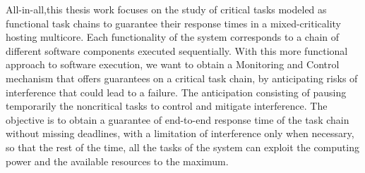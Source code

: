 \documentclass[french, a4paper, 11pt, twoside, pdftex]{StyleThese}
\begin{document}
{	All-in-all,this thesis work focuses on the study of critical tasks modeled as functional task chains to guarantee their response times in a mixed-criticality hosting multicore. Each functionality of the system corresponds to a chain of different software components executed sequentially. With this more functional approach to software execution, we want to obtain a Monitoring and Control mechanism that offers guarantees on a critical task chain, by anticipating risks of interference that could lead to a failure. The anticipation consisting of pausing temporarily the noncritical tasks to control and mitigate interference. The objective is to obtain a guarantee of end-to-end response time of the task chain without missing deadlines, with a limitation of interference only when necessary, so that the rest of the time, all the tasks of the system can exploit the computing power and the available resources to the maximum. 
	
}

\ifdefined{}
\else


\end{document}
